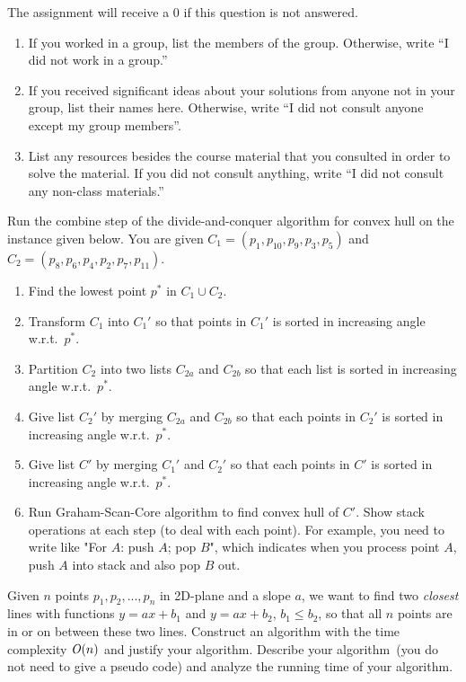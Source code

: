 \documentclass[11pt]{article}
\begin{document}
\begin{qunlist}
\setcounter{sparectr}{-1}

	The assignment will receive a 0 if this question is not answered.
\begin{enumerate}
	\item If you worked in a group, list the members of the group. Otherwise, write ``I did not work in a group.''
	\item If you received significant ideas about your solutions from anyone not in your group, list their names here. Otherwise, write ``I did not consult  anyone except my group members''.
	\item List any resources besides the course material that you consulted in order to solve the material. If you did not consult anything, write ``I did not consult any non-class materials.''
\end{enumerate}

Run the combine step of the divide-and-conquer algorithm for convex hull
on the instance given below. You are given $C_1 = (p_1, p_{10}, p_9, p_3, p_5)$
and $C_2 = (p_8, p_{6}, p_4, p_2, p_7, p_{11})$.
\begin{enumerate}
\item Find the lowest point $p^*$ in $C_1\cup C_2$.
\item Transform $C_1$ into $C_1'$ so that points in $C_1'$ is sorted in increasing angle w.r.t.\ $p^*$.
\item Partition $C_2$ into two lists $C_{2a}$ and $C_{2b}$ so that each list is sorted in increasing angle w.r.t.\ $p^*$.
\item Give list $C_2'$ by merging $C_{2a}$ and $C_{2b}$ so that each points in $C_2'$ is sorted in increasing angle w.r.t.\ $p^*$.
\item Give list $C'$ by merging $C_1'$ and $C_2'$ so that each points in $C'$ is sorted in increasing angle w.r.t.\ $p^*$.
\item Run Graham-Scan-Core algorithm to find convex hull of $C'$.
Show stack operations at each step (to deal with each point). For example,
you need to write like "For $A$: push $A$; pop $B$", which indicates when
you process point $A$, push $A$ into stack and also pop $B$ out.
\end{enumerate}

\begin{figure}[h]

\end{figure}


Given $n$ points $p_1, p_2, ..., p_n$ in 2D-plane and a slope $a$, we want to
find two \emph{closest} lines with functions $y = ax + b_1$ and $y = ax + b_2$, $b_1
\leq b_2$, so that all $n$ points are in or on between these two lines.
Construct an algorithm with the time complexity $\mathit{O}(n)$ and justify your
algorithm. Describe your algorithm~(you do not need to give a pseudo code)
and analyze the running time of your algorithm.



\end{qunlist}
\end{document}
